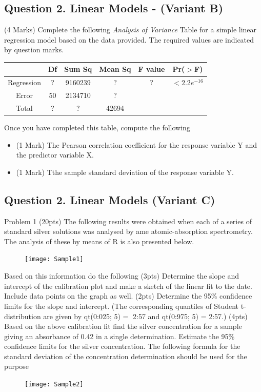 \documentclass[a4paper,12pt]{article}
\begin{document}
\subsection*{Question 2. Linear Models - (Variant B) }
(4 Marks) Complete the following \textit{Analysis of Variance} Table for a simple linear regression model based on the data provided. The required values are indicated by question marks.
\begin{center}
\begin{tabular}{|c|c|c|c|c|c|} \hline
           & Df & 	Sum Sq &	Mean Sq &	F value &   	Pr($>$F)    \\ \hline
Regression &  ? &	9160239 &	? &	 ? &	$< 2.2e^{-16}$ \\ \hline
    Error  & 50 &	2134710 &  	?   &            &       \\ \hline
    Total  & ?  &	? &  	42694   &            &       \\ \hline
\end{tabular} 
\end{center}

Once you have completed this table, compute the following
\begin{itemize}
	\item (1 Mark)  The Pearson correlation coefficient for the response variable Y and the predictor variable X.
	\item (1 Mark) Tthe sample standard deviation of the response variable Y.
\end{itemize}

\newpage

\subsection{Question 2. Linear Models (Variant C)}
Problem 1 (20pts)
The following results were obtained when each of a series of standard silver solutions was analysed by
ame atomic-absorption spectrometry. The analysis of these by means of R is also presented below.
\begin{figure}[h!]
\centering
\texttt{[image: Sample1]}
\caption{}
\label{fig:Sample1}
\end{figure}

Based on this information do the following
(3pts) Determine the slope and intercept of the calibration plot and make a sketch of the linear fit to
the date. Include data points on the graph as well.
(2pts) Determine the 95\% confidence limits for the slope and intercept. (The corresponding quantiles
of Student t-distribution are given by qt(0:025; 5) = 􀀀2:57 and qt(0:975; 5) = 2:57.)
(4pts) Based on the above calibration fit find the silver concentration for a sample giving an absorbance
of 0.42 in a single determination. Estimate the 95\% confidence limits for the silver concentration.
The following formula for the standard deviation of the concentration determination should be
used for the purpose
\begin{figure}[h!]
\centering
\texttt{[image: Sample2]}
\end{figure}
\end{document}
